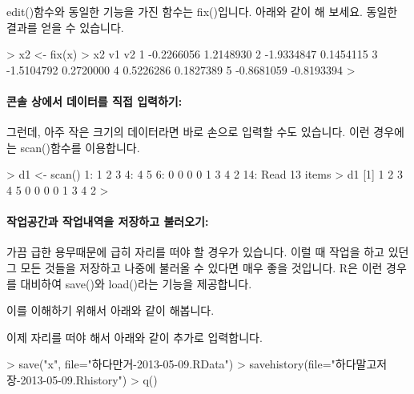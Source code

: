 edit()함수와 동일한 기능을 가진 함수는 fix()입니다. 
아래와 같이 해 보세요. 동일한 결과를 얻을 수 있습니다. 
\begin{Schunk}
\begin{Soutput}
> x2 <- fix(x)
> x2
          v1         v2
1 -0.2266056  1.2148930
2 -1.9334847  0.1454115
3 -1.5104792  0.2720000
4  0.5226286  0.1827389
5 -0.8681059 -0.8193394
> 
\end{Soutput}
\end{Schunk}

\paragraph{콘솔 상에서 데이터를 직접 입력하기:}
그런데, 아주 작은 크기의 데이터라면 바로 손으로 입력할 수도 있습니다.
이런 경우에는 scan()함수를 이용합니다. 

\begin{Schunk}
\begin{Soutput}
> d1 <- scan()
1: 1 2 3 
4: 4 5 
6: 0 0 0 0 1 3 4 2 
14: 
Read 13 items
> d1
 [1] 1 2 3 4 5 0 0 0 0 1 3 4 2
> 
\end{Soutput}
\end{Schunk}

\paragraph{작업공간과 작업내역을 저장하고 불러오기:}
가끔 급한 용무때문에 급히 자리를 떠야 할 경우가 있습니다. 
이럴 때 작업을 하고 있던 그 모든 것들을 저장하고 나중에 불러올 수 있다면 매우 좋을 것입니다.
R은 이런 경우를 대비하여 save()와 load()라는 기능을 제공합니다. 

이를 이해하기 위해서 아래와 같이 해봅니다. 

\begin{Schunk}
\end{Schunk}

이제 자리를 떠야 해서 아래와 같이 추가로 입력합니다. 

\begin{Schunk}
\begin{Soutput}
> save("x", file="하다만거-2013-05-09.RData")
> savehistory(file="하다말고저장-2013-05-09.Rhistory")
> q()
\end{Soutput}
\end{Schunk}

